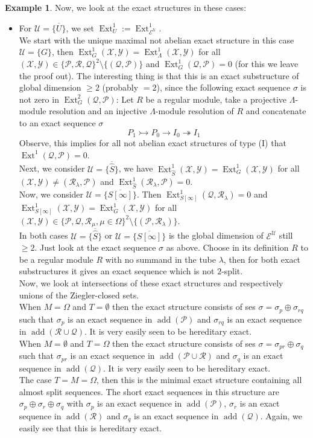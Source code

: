 \documentclass[11pt,a4paper]{amsart}
\theoremstyle{plain}
\theoremstyle{definition}
\newtheorem{exa}[thm]{Example}
\DeclareMathOperator{\Ext}{Ext}
\newcommand{\defl}{\twoheadrightarrow}
\newcommand{\infl}{\rightarrowtail}
\newcommand{\La}{\Lambda}
\newcommand{\mcE}{\mathcal{E}}
\newcommand{\mcP}{\mathcal{P}}
\newcommand{\mcQ}{\mathcal{Q}}
\newcommand{\mcR}{\mathcal{R}}
\newcommand{\mcU}{\mathcal{U}}
\newcommand{\mcX}{\mathcal{X}}
\newcommand{\mcY}{\mathcal{Y}}
\DeclareMathOperator{\add}{add}
\begin{document}
\begin{exa}
Now, we look at the exact structures in these cases: 
\begin{itemize}
\item[(I)] 
For $\mcU=\overline{\{U\}}$, we set $\Ext^1_U:=\Ext^1_{\mcE^{\mcU}}$. \\
We start with the unique maximal not abelian exact structure in this case $\mcU=\{G\}$, then $\Ext^1_G(\mcX, \mcY)= \Ext^1_{\La}(\mcX, \mcY)$ for all $(\mcX, \mcY) \in \{\mcP, \mcR, \mcQ\}^2\setminus \{(\mcQ, \mcP)\}$ and $\Ext^1_G(\mcQ, \mcP)=0$ (for this we leave the proof out). The interesting thing is that this is an exact substructure of global dimension $\geq 2$ (probably $=2$), since the following exact sequence $\sigma$ is not zero in $\Ext^2_G(\mcQ, \mcP)$: Let $R$ be a regular module, take a projective $\La$-module resolution and an injective $\La$-module resolution of $R$ and concatenate to an exact sequence $\sigma$
\[
P_1\infl P_0 \to I_0 \defl I_1
\]
Observe, this implies for all not abelian exact structures of type (I) that $\Ext^1( \mcQ, \mcP)=0$. \\
Next, we consider $\mcU=\overline{\{\hat{S}\}}$, we have $\Ext^1_{\hat{S}} (\mcX, \mcY) = \Ext^1_G (\mcX, \mcY)$ for all $(\mcX, \mcY)\neq (\mcR_{\lambda}, \mcP)$ and $\Ext^1_{\hat{S}} (\mcR_{\lambda}, \mcP) =0$.  \\
Now, we consider $\mcU=\overline{\{S[\infty]\}}$. Then $\Ext^1_{S[\infty]}(\mcQ, \mcR_{\lambda})=0$ and $\Ext^1_{S[\infty]}(\mcX, \mcY)=\Ext^1_{G}(\mcX, \mcY)$ for all $(\mcX, \mcY) \in \{ \mcP, \mcQ, \mcR_{\mu}, \mu \in \Omega\}^2\setminus \{(\mcP, \mcR_{\lambda})\}$. \\
In both cases $\mcU=\overline{\{\hat{S}\}}$ or $\mcU=\overline{\{S[\infty]\}}$ is the global dimension of $\mcE^{\mcU}$ still $\geq 2$. Just look at the exact sequence $\sigma$ as above. Choose in its definition $R$ to be a regular module $R$ with no summand in the tube $\lambda$, then for both exact substructures it gives an exact sequence which is not $2$-split. \\
Now, we look at intersections of these exact structures and respectively unions of the Ziegler-closed sets. \\
When $M=\Omega$ and $T=\emptyset$ then the exact structure consists of ses $\sigma = \sigma_p \oplus \sigma_{rq} $ such that $\sigma_p$ is an exact sequence in $\add (\mcP)$ and $\sigma_{rq}$ is an exact sequence in $\add (\mcR \cup \mcQ)$. It is very easily seen to be hereditary exact. \\
When $M=\emptyset$ and $T=\Omega$ then the exact structure consists of ses $\sigma = \sigma_{pr} \oplus \sigma_{q} $ such that $\sigma_{pr}$ is an exact sequence in $\add (\mcP\cup \mcR)$ and $\sigma_{q}$ is an exact sequence in $\add (\mcQ)$. It is very easily seen to be hereditary exact. \\
The case $T=M= \Omega$, then this is the minimal exact structure containing all almost split sequences. The short exact sequences in this structure are $\sigma_p \oplus \sigma_r \oplus \sigma_q$ with 
$\sigma_{p}$ is an exact sequence in $\add (\mcP)$, $\sigma_{r}$ is an exact sequence in $\add (\mcR)$ and $\sigma_{q}$ is an exact sequence in $\add (\mcQ)$. Again, we easily see that this is hereditary exact. 


\end{itemize}
\end{exa}
\end{document}
